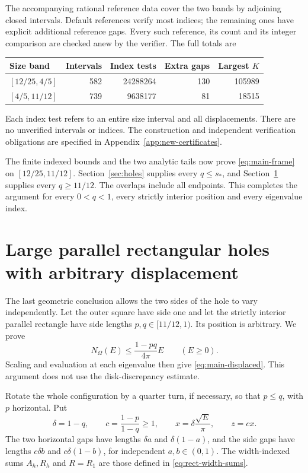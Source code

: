 \documentclass[11pt,reqno]{amsart}
\numberwithin{equation}{section}
\newcommand{\Om}{\Omega}
\begin{document}
The accompanying rational reference data cover the two bands
by adjoining closed intervals. Default references verify
most indices; the remaining ones have explicit additional
reference gaps. Every such reference, its count and its
integer comparison are checked anew by the verifier.
The full totals are
\begin{center}
\small
\begin{tabular}{@{}lrrrr@{}}
\toprule
Size band & Intervals & Index tests & Extra gaps & Largest $K$\\
\midrule
$[12/25,4/5]$ & 582 & 24288264 & 130 & 105989\\
$[4/5,11/12]$ & 739 & 9638177 & 81 & 18515\\
\bottomrule
\end{tabular}
\end{center}
Each index test refers to an entire size interval and all
displacements. There are no unverified intervals or indices.
The construction and independent verification obligations
are specified in Appendix~\ref{app:new-certificates}.

The finite indexed bounds and the two analytic tails now
prove \eqref{eq:main-frame} on $[12/25,11/12]$.
Section~\ref{sec:holes} supplies every $q\le s_*$, and
Section~\ref{sec:displaced} supplies every $q\ge11/12$.
The overlaps include all endpoints. This completes the
argument for every $0<q<1$, every strictly interior
position and every eigenvalue index.

\section{Large parallel rectangular holes with arbitrary displacement}\label{sec:displaced}

The last geometric conclusion allows the two sides of the hole to vary
independently. Let the outer square have side one and let the strictly
interior parallel rectangle have side lengths $p,q\in[11/12,1)$.
Its position is arbitrary. We prove
\[
 N_\Om(E)\le\frac{1-pq}{4\pi}E\qquad(E\ge0).
\]
Scaling and evaluation at each eigenvalue then give
\eqref{eq:main-displaced}. This argument does not use the
disk-discrepancy estimate.

Rotate the whole configuration by a quarter turn, if necessary, so
that $p\le q$, with $p$ horizontal. Put
\[
 \delta=1-q,\qquad c=\frac{1-p}{1-q}\ge1,
 \qquad x=\delta\frac{\sqrt E}{\pi},\qquad z=cx.
\]
The two horizontal gaps have lengths $\delta a$ and
$\delta(1-a)$, and the side gaps have lengths $c\delta b$ and
$c\delta(1-b)$, for independent $a,b\in(0,1)$. The width-indexed sums $A_h,R_h$ and $R=R_1$ are those
defined in \eqref{eq:rect-width-sums}.
\end{document}
